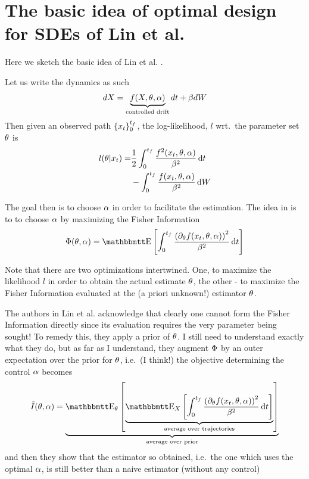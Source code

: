 \documentclass{article}
\begin{document}
\clearpage













\appendix
\section{The basic idea of optimal design for SDEs of Lin et al.}
Here we sketch the basic idea of Lin et al. \cite{Lin}. 

Let us write the dynamics as such
\begin{equation}
dX = \underbrace{f(X,{\theta}, {\alpha})}_{\textrm{controlled drift}}dt
+ {\beta} dW
\end{equation}
Then given an observed path $\{x_t\}_0^{ t_f }$, the log-likelihood, $l$ wrt.\ the
parameter set ${\theta}$ is
\begin{align}
l({\theta} | x_t) =&  \frac 12 \int_0^{ t_f } \frac{f^2(x_t,{\theta}, {\alpha})}{{\beta}^2} \, \mathrm{d} t
\notag
\\
&- \int_0^{ t_f }  \frac{f(x_t,{\theta}, {\alpha})}{{\beta}^2} \, \mathrm{d} W
\label{eq:log_likelihood_cts_time}
\end{align}

The goal then is to choose ${\alpha}$ in order to facilitate the estimation. The idea
in \cite{Lin} is to to choose ${\alpha}$ by maximizing the Fisher Information
\begin{equation}
\FI(\th, \a) = \Exp \left[ \int_0^\tf \frac{ \left( \di_\th f(x_t,\th, \a)
\right)^2}{\b^2}
\intd{t}
\right]
\label{eq:Fisher_Information}
\end{equation}

Note that there are two optimizations intertwined. One, to maximize
the likelihood $l$ in order to obtain the actual estimate ${\theta}$, the other - to
maximize the Fisher Information evaluated at the (a priori unknown!) estimator ${\theta}$.

The authors in Lin et al. \cite{Lin} acknowledge that clearly one cannot form
the Fisher Information directly since its evaluation requires the very
parameter being sought! To remedy this, they apply a prior of ${\theta}$. I
still need to understand exactly what they do, but as far as I understand, they
augment ${\Phi}$ by an outer expectation over the prior for ${\theta}$, i.e.\ (I think!) 
the objective determining the control ${\alpha}$ becomes
\begin{equation}
\tilde{I}(\th, \a) = \underbrace{\Exp_\th \left [
\underbrace{\Exp_{X} \left[ \int_0^\tf
\frac{ \left( \di_\th f(x_t,\th, \a) \right)^2}{\b^2}
\intd{t}
\right]}_{\textrm{average over trajectories}}
\right]}_{\textrm{average over prior}}
\label{eq:Fisher_Information}
\end{equation}
and then they show that the estimator so obtained, i.e.\ the one which uses the
optimal ${\alpha}$, is still better than a naive estimator (without any control)
 
\end{document}
